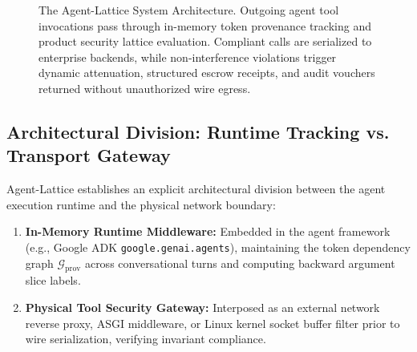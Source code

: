 \documentclass[conference,10pt]{IEEEtran}
\begin{document}
\begin{figure}[t]
{%
}
\caption{The Agent-Lattice System Architecture. Outgoing agent tool invocations pass through in-memory token provenance tracking and product security lattice evaluation. Compliant calls are serialized to enterprise backends, while non-interference violations trigger dynamic attenuation, structured escrow receipts, and audit vouchers returned without unauthorized wire egress.}
\label{fig:arch}
\end{figure}

\subsection{Architectural Division: Runtime Tracking vs. Transport Gateway}
Agent-Lattice establishes an explicit architectural division between the agent execution runtime and the physical network boundary:
\begin{enumerate}
    \item \textbf{In-Memory Runtime Middleware:} Embedded in the agent framework (e.g., Google ADK \texttt{google.genai.agents}), maintaining the token dependency graph $\mathcal{G}_{\text{prov}}$ across conversational turns and computing backward argument slice labels.
    \item \textbf{Physical Tool Security Gateway:} Interposed as an external network reverse proxy, ASGI middleware, or Linux kernel socket buffer filter prior to wire serialization, verifying invariant compliance.
\end{enumerate}
\end{document}
